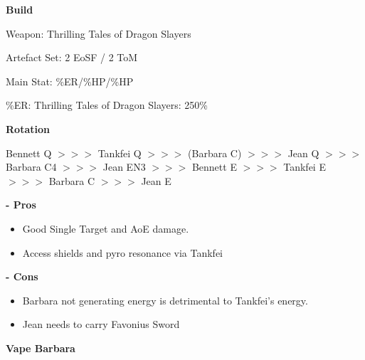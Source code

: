 \documentclass[11pt]{article}
\begin{document}
\textbf{\small{Build}}

Weapon: Thrilling Tales of Dragon Slayers

Artefact Set: 2 EoSF / 2 ToM

Main Stat: \%ER/\%HP/\%HP 

\%ER: Thrilling Tales of Dragon Slayers: 250\%

\textbf{\small{Rotation}} 

\begin{center}
    Bennett Q $>>>$ Tankfei Q $>>>$ (Barbara C) $>>>$ Jean Q $>>>$ Barbara C4 $>>>$ Jean EN3 $>>>$ Bennett E $>>>$ Tankfei E $>>>$ Barbara C $>>>$ Jean E
\end{center} 

\textbf{\small{- Pros}}

\begin{itemize}
    \item Good Single Target and AoE damage. 
    \item Access shields and pyro resonance via Tankfei
\end{itemize}

\textbf{\small{- Cons}}

\begin{itemize}
    \item Barbara not generating energy is detrimental to Tankfei's energy.
    \item Jean needs to carry Favonius Sword
\end{itemize}

\newpage

\textbf{Vape Barbara}
\end{document}
